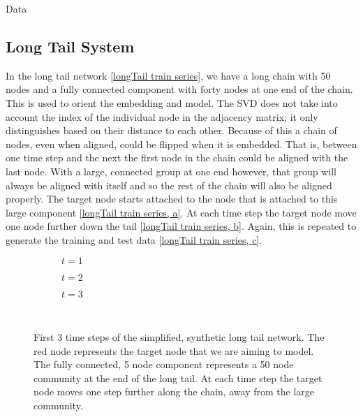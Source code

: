 \documentclass[12pt]{amsart}
\begin{document}
\begin{section}{Data}
    \subsection{Long Tail System}
        In the long tail network \autoref{longTail train series}, we have a long chain with 50 nodes and a fully connected component with forty nodes at one end of the chain. This is used to orient the embedding and model. The SVD does not take into account the index of the individual node in the adjacency matrix; it only distinguishes based on their distance to each other. Because of this a chain of nodes, even when aligned, could be flipped when it is embedded. That is, between one time step and the next the first node in the chain could be aligned with the last node. With a large, connected group at one end however, that group will always be aligned with itself and so the rest of the chain will also be aligned properly. The target node starts attached to the node that is attached to this large component \autoref{longTail train series, a}. At each time step the target node move one node further down the tail \autoref{longTail train series, b}. Again, this is repeated to generate the training and test data \autoref{longTail train series, c}.
        \begin{figure}[H]
            \centering
            \begin{subfigure}[c]{0.3\textwidth}
                \centering
                \resizebox{.6\width}{!}{}
                \caption{$t=1$}
                \label{longTail train series, a}
            \end{subfigure}
            \hfill
            \centering
            \begin{subfigure}[c]{0.3\textwidth}
                \centering
                \resizebox{.6\width}{!}{}
                \caption{$t=2$}
                \label{longTail train series, b}
            \end{subfigure}
            \hfill
            \centering
            \begin{subfigure}[c]{0.3\textwidth}
                \centering
                \resizebox{.6\width}{!}{}
                \caption{$t=3$}
                \label{longTail train series, c}
            \end{subfigure}\\
            \caption{First 3 time steps of the simplified, synthetic long tail network. The red node represents the target node that we are aiming to model. The fully connected, 5 node component represents a 50 node community at the end of the long tail. At each time step the target node moves one step further along the chain, away from the large community.}
            \label{longTail train series}
        \end{figure}    


\end{section}
\end{document}
